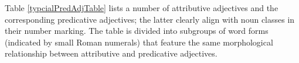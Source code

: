 Table \vref{typcialPredAdjTable} lists a number of attributive adjectives and the corresponding predicative adjectives; the latter clearly align with noun classes in their number marking. %
The table is divided into subgroups of word forms (indicated by small Roman numerals) that feature the same morphological relationship between attributive and predicative adjectives. 
